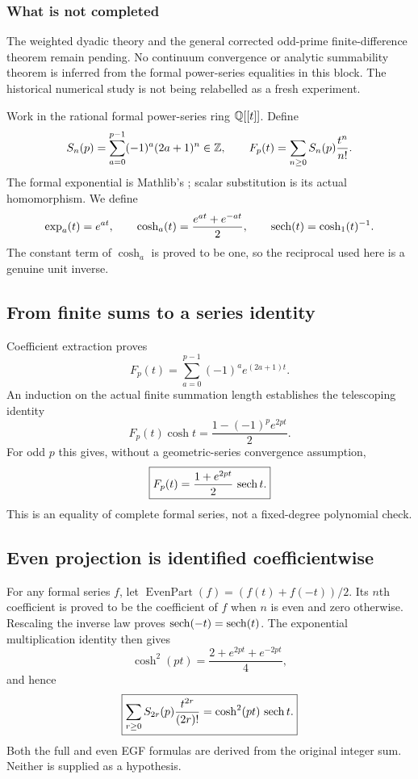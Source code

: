 \subsubsection*{What is not completed}
The weighted dyadic theory and the general corrected odd-prime finite-difference theorem remain pending. No continuum convergence or analytic summability theorem is inferred from the formal power-series equalities in this block. The historical numerical study is not being relabelled as a fresh experiment.
\par\medskip
{}
Work in the rational formal power-series ring $\mathbb Q[[t]]$. Define
\[
 S_n(p)=\sum_{a=0}^{p-1}(-1)^a(2a+1)^n\in\mathbb Z,
 \qquad F_p(t)=\sum_{n\ge0}S_n(p)\frac{t^n}{n!}.
\]
The formal exponential is Mathlib's ; scalar substitution is its actual  homomorphism. We define
\[
 \exp_a(t)=e^{at},\qquad
 \cosh_a(t)=\frac{e^{at}+e^{-at}}2,\qquad
 \operatorname{sech}(t)=\cosh_1(t)^{-1}.
\]
The constant term of $\cosh_a$ is proved to be one, so the reciprocal used here is a genuine unit inverse.

\subsection*{From finite sums to a series identity}
Coefficient extraction proves
\[
 F_p(t)=\sum_{a=0}^{p-1}(-1)^a e^{(2a+1)t}.
\]
An induction on the actual finite summation length establishes the telescoping identity
\[
 F_p(t)\cosh t=\frac{1-(-1)^p e^{2pt}}2.
\]
For odd $p$ this gives, without a geometric-series convergence assumption,
\[
 \boxed{F_p(t)=\frac{1+e^{2pt}}2\,\operatorname{sech} t.}
\]
This is an equality of complete formal series, not a fixed-degree polynomial check.

\subsection*{Even projection is identified coefficientwise}
For any formal series $f$, let $\operatorname{EvenPart}(f)=(f(t)+f(-t))/2$. Its $n$th coefficient is proved to be the coefficient of $f$ when $n$ is even and zero otherwise. Rescaling the inverse law proves $\operatorname{sech}(-t)=\operatorname{sech}(t)$. The exponential multiplication identity then gives
\[
 \cosh^2(pt)=\frac{2+e^{2pt}+e^{-2pt}}4,
\]
and hence
\[
 \boxed{\sum_{r\ge0}S_{2r}(p)\frac{t^{2r}}{(2r)!}
       =\cosh^2(pt)\,\operatorname{sech} t.}
\]
Both the full and even EGF formulas are derived from the original integer sum. Neither is supplied as a hypothesis.

